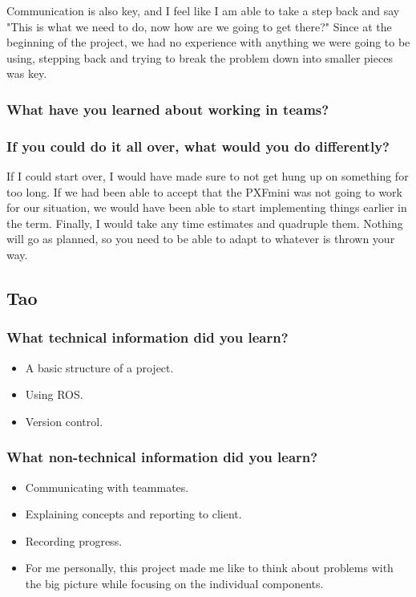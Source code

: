 \documentclass[compsoc,draftclsnofoot,onecolumn,10pt]{IEEEtran}
\begin{document}
Communication is also key, and I feel like I am able to take a step back and say "This is what we need to do, now how are we going to get there?" Since at the beginning of the project, we had no experience with anything we were going to be using, stepping back and trying to break the problem down into smaller pieces was key. 

\subsubsection*{What have you learned about working in teams?}

\subsubsection*{If you could do it all over, what would you do differently?}
If I could start over, I would have made sure to not get hung up on something for too long. If we had been able to accept that the PXFmini was not going to work for our situation, we would have been able to start implementing things earlier in the term. 
Finally, I would take any time estimates and quadruple them. Nothing will go as planned, so you need to be able to adapt to whatever is thrown your way.


\subsection{Tao}

\subsubsection*{What technical information did you learn?}
\begin{itemize}
    \item A basic structure of a project.
    \item Using ROS.
    \item Version control.
\end{itemize}

\subsubsection*{What non-technical information did you learn?}
\begin{itemize}
    \item Communicating with teammates.
    \item Explaining concepts and reporting to client.
    \item Recording progress.
    \item For me personally, this project made me like to think about
    problems with the big picture while focusing on the individual components.
\end{itemize}
\end{document}
